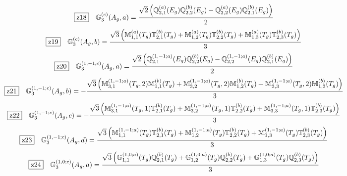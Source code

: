 \documentclass[fleqn,10pt,landscape]{jsarticle}
\begin{document}
\begin{dmath*}
\hspace*{3mm}\fbox{z18}\quad \mathbb{G}_{3}^{(c)}(A_{g},a)=\frac{\sqrt{2} \left(\mathbb{Q}_{2,1}^{(a)}(E_{g}) \mathbb{Q}_{2,2}^{(b)}(E_{g}) - \mathbb{Q}_{2,2}^{(a)}(E_{g}) \mathbb{Q}_{2,1}^{(b)}(E_{g})\right)}{2}
\end{dmath*}
\begin{dmath*}
\hspace*{3mm}\fbox{z19}\quad \mathbb{G}_{3}^{(c)}(A_{g},b)=\frac{\sqrt{3} \left(\mathbb{M}_{1,1}^{(a)}(T_{g}) \mathbb{T}_{2,1}^{(b)}(T_{g}) + \mathbb{M}_{1,2}^{(a)}(T_{g}) \mathbb{T}_{2,2}^{(b)}(T_{g}) + \mathbb{M}_{1,3}^{(a)}(T_{g}) \mathbb{T}_{2,3}^{(b)}(T_{g})\right)}{3}
\end{dmath*}
\begin{dmath*}
\hspace*{3mm}\fbox{z20}\quad \mathbb{G}_{3}^{(1,-1;c)}(A_{g},a)=\frac{\sqrt{2} \left(\mathbb{Q}_{2,1}^{(1,-1;a)}(E_{g}) \mathbb{Q}_{2,2}^{(b)}(E_{g}) - \mathbb{Q}_{2,2}^{(1,-1;a)}(E_{g}) \mathbb{Q}_{2,1}^{(b)}(E_{g})\right)}{2}
\end{dmath*}
\begin{dmath*}
\hspace*{3mm}\fbox{z21}\quad \mathbb{G}_{3}^{(1,-1;c)}(A_{g},b)=- \frac{\sqrt{3} \left(\mathbb{M}_{3,1}^{(1,-1;a)}(T_{g},2) \mathbb{M}_{1,1}^{(b)}(T_{g}) + \mathbb{M}_{3,2}^{(1,-1;a)}(T_{g},2) \mathbb{M}_{1,2}^{(b)}(T_{g}) + \mathbb{M}_{3,3}^{(1,-1;a)}(T_{g},2) \mathbb{M}_{1,3}^{(b)}(T_{g})\right)}{3}
\end{dmath*}
\begin{dmath*}
\hspace*{3mm}\fbox{z22}\quad \mathbb{G}_{3}^{(1,-1;c)}(A_{g},c)=- \frac{\sqrt{3} \left(\mathbb{M}_{3,1}^{(1,-1;a)}(T_{g},1) \mathbb{T}_{2,1}^{(b)}(T_{g}) + \mathbb{M}_{3,2}^{(1,-1;a)}(T_{g},1) \mathbb{T}_{2,2}^{(b)}(T_{g}) + \mathbb{M}_{3,3}^{(1,-1;a)}(T_{g},1) \mathbb{T}_{2,3}^{(b)}(T_{g})\right)}{3}
\end{dmath*}
\begin{dmath*}
\hspace*{3mm}\fbox{z23}\quad \mathbb{G}_{3}^{(1,-1;c)}(A_{g},d)=\frac{\sqrt{3} \left(\mathbb{M}_{1,1}^{(1,-1;a)}(T_{g}) \mathbb{T}_{2,1}^{(b)}(T_{g}) + \mathbb{M}_{1,2}^{(1,-1;a)}(T_{g}) \mathbb{T}_{2,2}^{(b)}(T_{g}) + \mathbb{M}_{1,3}^{(1,-1;a)}(T_{g}) \mathbb{T}_{2,3}^{(b)}(T_{g})\right)}{3}
\end{dmath*}
\begin{dmath*}
\hspace*{3mm}\fbox{z24}\quad \mathbb{G}_{3}^{(1,0;c)}(A_{g},a)=\frac{\sqrt{3} \left(\mathbb{G}_{1,1}^{(1,0;a)}(T_{g}) \mathbb{Q}_{2,1}^{(b)}(T_{g}) + \mathbb{G}_{1,2}^{(1,0;a)}(T_{g}) \mathbb{Q}_{2,2}^{(b)}(T_{g}) + \mathbb{G}_{1,3}^{(1,0;a)}(T_{g}) \mathbb{Q}_{2,3}^{(b)}(T_{g})\right)}{3}
\end{dmath*}
\end{document}
